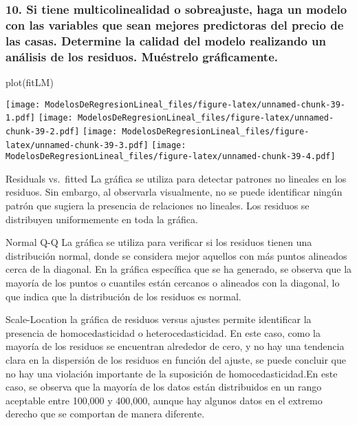 \documentclass[
]{article}
\newenvironment{Shaded}{\begin{snugshade}}{\end{snugshade}}
\newcommand{\FunctionTok}[1]{\textcolor[rgb]{0.00,0.00,0.00}{#1}}
\newcommand{\NormalTok}[1]{#1}
\begin{document}
\hypertarget{si-tiene-multicolinealidad-o-sobreajuste-haga-un-modelo-con-las-variables-que-sean-mejores-predictoras-del-precio-de-las-casas.-determine-la-calidad-del-modelo-realizando-un-anuxe1lisis-de-los-residuos.-muuxe9strelo-gruxe1ficamente.}{%
\subsubsection{10. Si tiene multicolinealidad o sobreajuste, haga un
modelo con las variables que sean mejores predictoras del precio de las
casas. Determine la calidad del modelo realizando un análisis de los
residuos. Muéstrelo
gráficamente.}\label{si-tiene-multicolinealidad-o-sobreajuste-haga-un-modelo-con-las-variables-que-sean-mejores-predictoras-del-precio-de-las-casas.-determine-la-calidad-del-modelo-realizando-un-anuxe1lisis-de-los-residuos.-muuxe9strelo-gruxe1ficamente.}}

\begin{Shaded}
\begin{Highlighting}[]
\FunctionTok{plot}\NormalTok{(fitLM)}
\end{Highlighting}
\end{Shaded}

\texttt{[image: ModelosDeRegresionLineal\_files/figure-latex/unnamed-chunk-39-1.pdf]}
\texttt{[image: ModelosDeRegresionLineal\_files/figure-latex/unnamed-chunk-39-2.pdf]}
\texttt{[image: ModelosDeRegresionLineal\_files/figure-latex/unnamed-chunk-39-3.pdf]}
\texttt{[image: ModelosDeRegresionLineal\_files/figure-latex/unnamed-chunk-39-4.pdf]}

Residuals vs.~fitted La gráfica se utiliza para detectar patrones no
lineales en los residuos. Sin embargo, al observarla visualmente, no se
puede identificar ningún patrón que sugiera la presencia de relaciones
no lineales. Los residuos se distribuyen uniformemente en toda la
gráfica.

Normal Q-Q La gráfica se utiliza para verificar si los residuos tienen
una distribución normal, donde se considera mejor aquellos con más
puntos alineados cerca de la diagonal. En la gráfica específica que se
ha generado, se observa que la mayoría de los puntos o cuantiles están
cercanos o alineados con la diagonal, lo que indica que la distribución
de los residuos es normal.

Scale-Location la gráfica de residuos versus ajustes permite identificar
la presencia de homocedasticidad o heterocedasticidad. En este caso,
como la mayoría de los residuos se encuentran alrededor de cero, y no
hay una tendencia clara en la dispersión de los residuos en función del
ajuste, se puede concluir que no hay una violación importante de la
suposición de homocedasticidad.En este caso, se observa que la mayoría
de los datos están distribuidos en un rango aceptable entre 100,000 y
400,000, aunque hay algunos datos en el extremo derecho que se comportan
de manera diferente.
\end{document}
